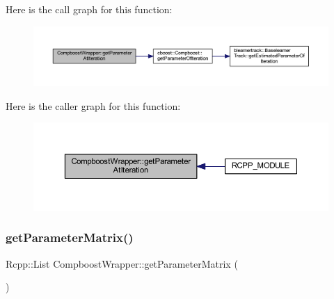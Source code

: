 Here is the call graph for this function\+:\nopagebreak
\begin{figure}[H]
\begin{center}
\leavevmode
\includegraphics[width=350pt]{class_compboost_wrapper_ac5d5d21932a27b470abbfb0fd55a75ec_cgraph}
\end{center}
\end{figure}
Here is the caller graph for this function\+:\nopagebreak
\begin{figure}[H]
\begin{center}
\leavevmode
\includegraphics[width=350pt]{class_compboost_wrapper_ac5d5d21932a27b470abbfb0fd55a75ec_icgraph}
\end{center}
\end{figure}
\mbox{\label{class_compboost_wrapper_a1ffa4829c1c8ce639049271f44823f94}} 
\subsubsection{\texorpdfstring{get\+Parameter\+Matrix()}{getParameterMatrix()}}
{\footnotesize\ttfamily Rcpp\+::\+List Compboost\+Wrapper\+::get\+Parameter\+Matrix (\begin{DoxyParamCaption}{ }\end{DoxyParamCaption})\hspace{0.3cm}{\ttfamily [inline]}}

